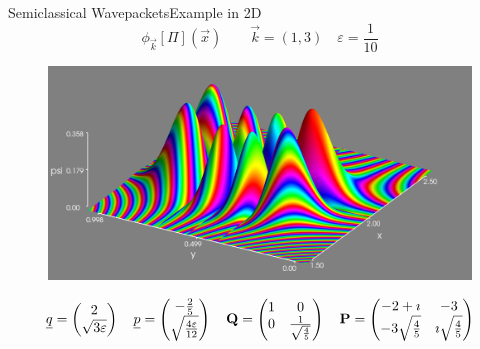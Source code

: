 \documentclass{beamer}
\begin{document}
\begin{frame}{Semiclassical Wavepackets}{Example in 2D}
  \vspace{-0.4cm}
  \scriptsize
  \begin{equation*}
    \phi_{\vec{k}}[\Pi](\vec{x}) \quad\quad \vec{k} = (1,3) \quad \varepsilon = \frac{1}{10}
  \end{equation*}
  \vspace{-0.4cm}
  \begin{figure}[h!]
    \centering
    \includegraphics[width=0.8\linewidth]{./fig/wavepackets_2d.png}
  \end{figure}
    \scriptsize
  \begin{equation*}
    \underline{q} =
    \begin{pmatrix}
      2 \\ \sqrt{3\varepsilon}
    \end{pmatrix}
    \quad
    \underline{p} =
    \begin{pmatrix}
      -\frac{2}{5} \\ \sqrt{\frac{4\varepsilon}{12}}
    \end{pmatrix}
    \quad
    \mathbf{Q} =
    \begin{pmatrix}
      1 & 0 \\
      0 & \frac{1}{\sqrt{\frac{4}{5}}}
    \end{pmatrix}
    \quad
    \mathbf{P} =
    \begin{pmatrix}
      -2+\imath & -3 \\
      -3\sqrt{\frac{4}{5}} & \imath\sqrt{\frac{4}{5}}
    \end{pmatrix}
  \end{equation*}
\end{frame}



\end{document}
